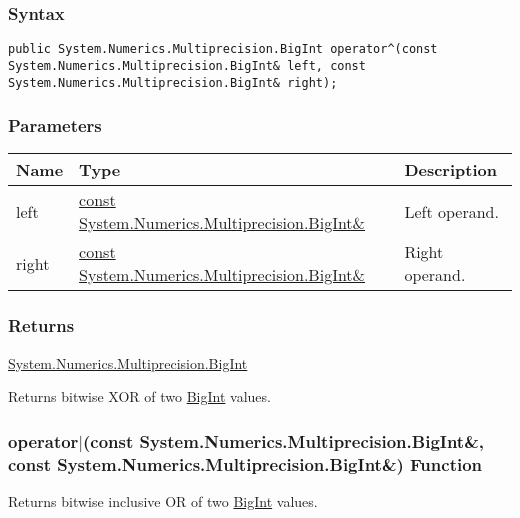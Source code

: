 \documentclass[a4paper,oneside,11.000000pt]{book}
\begin{document}
\subsubsection*{Syntax}
\texttt{public System.Numerics.Multiprecision.BigInt operator\^{}(const System.Numerics.Multiprecision.BigInt\& left, const System.Numerics.Multiprecision.BigInt\& right);}
\subsubsection*{Parameters}
\begin{flushleft}
\begin{supertabular}[l]{!{\raggedright}p{1.30721cm}!{\raggedright}p{8.55945cm}!{\raggedright}p{3.66839cm}}
\textbf{Name}
& \textbf{Type}
& \textbf{Description}
\\
\hline
left
& \hyperlink{System.Numerics.Multiprecision.BigInt}{const System.\-Numerics.\-Multiprecision.\-BigInt\&\-}
& Left operand.

\\
right
& \hyperlink{System.Numerics.Multiprecision.BigInt}{const System.\-Numerics.\-Multiprecision.\-BigInt\&\-}
& Right operand.

\\
\end{supertabular}

\end{flushleft}
\subsubsection*{Returns}
\hyperlink{System.Numerics.Multiprecision.BigInt}{System.\-Numerics.\-Multiprecision.\-BigInt}
\begin{flushleft}
Returns bitwise XOR of two \hyperlink{System.Numerics.Multiprecision.BigInt}{BigInt} values.

\end{flushleft}
\clearpage

\hypertarget{System.Numerics.Multiprecision.operator.or.C.R.System.Numerics.Multiprecision.BigInt.C.R.System.Numerics.Multiprecision.BigInt}{\subsubsection*{operator$|$(const System.Numerics.Multiprecision.BigInt\&, const System.Numerics.Multiprecision.BigInt\&) Function}}
\begin{flushleft}
Returns bitwise inclusive OR of two \hyperlink{System.Numerics.Multiprecision.BigInt}{BigInt} values.

\end{flushleft}
\end{document}
